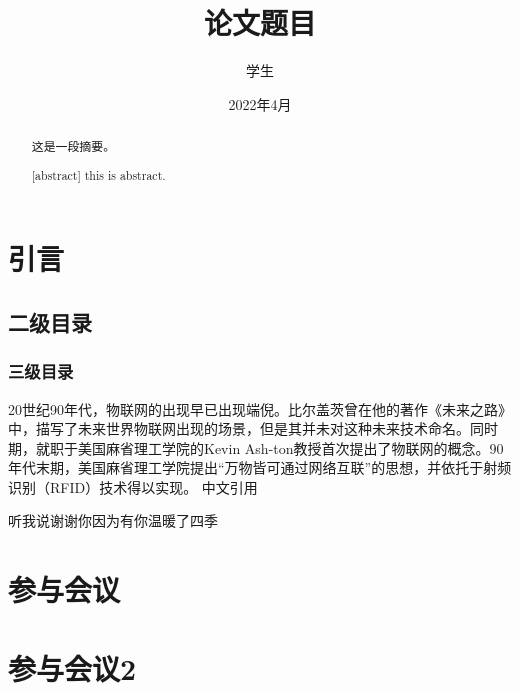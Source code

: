 \documentclass[]{GZUthesis}
\author{学生}
\title{论文题目}
\date{2022年4月}
\begin{document}
\maketitle
\page
\begin{abstract}
    这是一段摘要。
\end{abstract}
\newline
{}
\newpage
\begin{abstract}[abstract]
    this is abstract.
\end{abstract}
\newpage
\tableofcontents
\newpage
\content
\section{引言}
\subsection{二级目录}
\subsubsection{三级目录}

20世纪90年代，物联网的出现早已出现端倪。比尔盖茨曾在他的著作《未来之路》中，描写了未来世界物联网出现的场景，但是其并未对这种未来技术命名。\cite{gates1995road}同时期，就职于美国麻省理工学院的Kevin Ash-ton教授首次提出了物联网的概念。90年代末期，美国麻省理工学院提出“万物皆可通过网络互联”的思想，并依托于射频识别（RFID）技术得以实现。
中文引用\cite{孙其博2010物联网}

\newpage
\begin{thank}
    听我说谢谢你因为有你温暖了四季
\end{thank}
\newpage\printbibliography
\newpage

\begin{appendices}
    \section{参与会议}

    \section{参与会议2}
\end{appendices}
\promise
\end{document}
